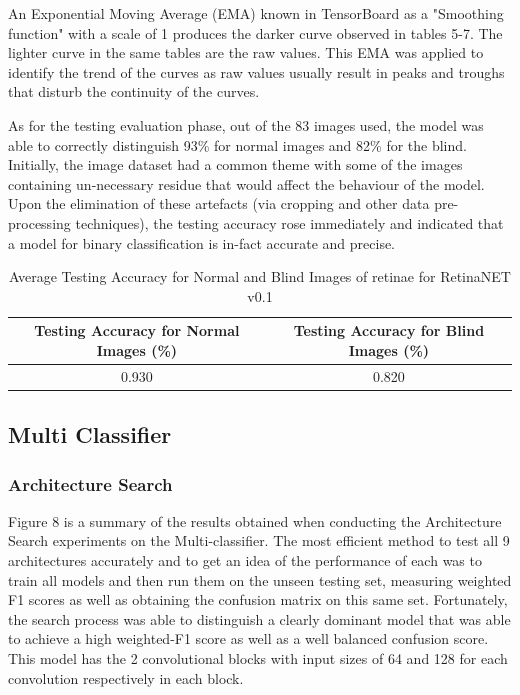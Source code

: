 \documentclass[a4paper]{article}
\begin{document}
    An Exponential Moving Average (EMA) known in TensorBoard as a "Smoothing function" with a scale of 1 produces the darker curve observed in tables 5-7. The lighter curve in the same tables are the raw values. This EMA was applied to identify the trend of the curves as raw values usually result in peaks and troughs that disturb the continuity of the curves.
    \vspace{3mm}  

    As for the testing evaluation phase, out of the 83 images used, the model was able to correctly distinguish 93\% for normal images and 82\% for the blind. Initially, the image dataset had a common theme with some of the images containing un-necessary residue that would affect the behaviour of the model. Upon the elimination of these artefacts (via cropping and other data pre-processing techniques), the testing accuracy rose immediately and indicated that a model for binary classification is in-fact accurate and precise.\vspace{3mm}

    \begin{table}[!h]
        \centering
            \begin{tabular}{||c c||} 
            \hline
            \textbf{Testing Accuracy for Normal Images (\%)} & \textbf{Testing Accuracy for Blind Images (\%)} \\
            \hline\hline
            0.930 & 0.820 \\
            \hline
            \end{tabular}
        \caption{\label{fig:4} Average Testing Accuracy for Normal and Blind Images of retinae for RetinaNET v0.1}
    \end{table}
    \subsection{Multi Classifier}
        \subsubsection{Architecture Search}
        Figure 8 is a summary of the results obtained when conducting the Architecture Search experiments on the Multi-classifier. The most efficient method to test all 9 architectures accurately and to get an idea of the performance of each was to train all models and then run them on the unseen testing set, measuring weighted F1 scores as well as obtaining the confusion matrix on this same set. Fortunately, the search process was able to distinguish a clearly dominant model that was able to achieve a high weighted-F1 score as well as a well balanced confusion score. This model has the 2 convolutional blocks with input sizes of 64 and 128 for each convolution respectively in each block.  
\end{document}
